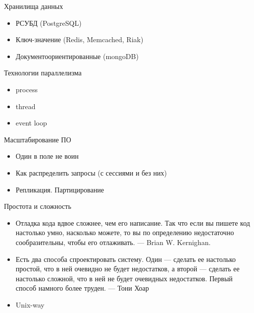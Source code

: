 \documentclass[aspectratio=169]{beamer}
\begin{document}
\begin{frame}{Хранилища данных}
\begin{itemize}
\item РСУБД (PostgreSQL)
\pause
\item Ключ-значение (Redis, Memcached, Riak)
\pause
\item Документоориентированные (mongoDB)
\end{itemize}
\end{frame}

\begin{frame}{Технологии параллелизма}
\begin{itemize}
\item process
\pause
\item thread
\pause
\item event loop
\end{itemize}
\end{frame}

\begin{frame}{Масштабирование ПО}
\begin{itemize}
\item Один в поле не воин
\pause
\item Как распределить запросы (с сессиями и без них)
\pause
\item Репликация. Партицирование
\end{itemize}
\end{frame}

\begin{frame}{Простота и сложность}
\begin{itemize}
\item Отладка кода вдвое сложнее, чем его написание. Так что если вы пишете код настолько умно, насколько можете, то вы по определению недостаточно сообразительны, чтобы его отлаживать. — Brian W. Kernighan.
\pause
\item Есть два способа спроектировать систему. Один — сделать ее настолько простой, что в ней очевидно не будет недостатков, а второй — сделать ее настолько сложной, что в ней не будет очевидных недостатков. Первый способ намного более труден. — Тони Хоар
\pause
\item Unix-way
\end{itemize}
\end{frame}
\end{document}
